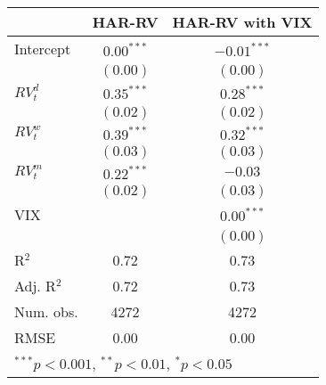 
\begin{tabular}{l c c }
\hline
 & HAR-RV & HAR-RV with VIX \\
\hline
Intercept    & $0.00^{***}$ & $-0.01^{***}$ \\
             & $(0.00)$     & $(0.00)$      \\
$RV_{t}^{d}$ & $0.35^{***}$ & $0.28^{***}$  \\
             & $(0.02)$     & $(0.02)$      \\
$RV_{t}^{w}$ & $0.39^{***}$ & $0.32^{***}$  \\
             & $(0.03)$     & $(0.03)$      \\
$RV_{t}^{m}$ & $0.22^{***}$ & $-0.03$       \\
             & $(0.02)$     & $(0.03)$      \\
VIX          &              & $0.00^{***}$  \\
             &              & $(0.00)$      \\
\hline
R$^2$        & 0.72         & 0.73          \\
Adj. R$^2$   & 0.72         & 0.73          \\
Num. obs.    & 4272         & 4272          \\
RMSE         & 0.00         & 0.00          \\
\hline
\multicolumn{3}{l}{\scriptsize{$^{***}p<0.001$, $^{**}p<0.01$, $^*p<0.05$}}
\end{tabular}
